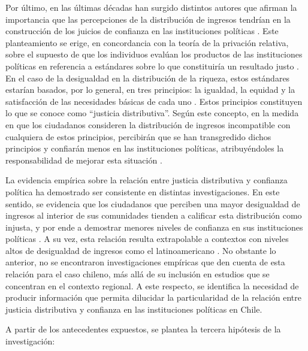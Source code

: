 \documentclass[12pt,twoside]{templates/facsothesis}
\begin{document}
Por último, en las últimas décadas han surgido distintos autores que afirman la importancia que las percepciones de la distribución de ingresos tendrían en la construcción de los juicios de confianza en las instituciones políticas \citep{vandermeerEconomicPerformancePolitical2018}. Este planteamiento se erige, en concordancia con la teoría de la privación relativa, sobre el supuesto de que los individuos evalúan los productos de las instituciones políticas en referencia a estándares sobre lo que constituiría un resultado justo \citep{tylerSocialJustice2015}. En el caso de la desigualdad en la distribución de la riqueza, estos estándares estarían basados, por lo general, en tres principios: la igualdad, la equidad y la satisfacción de las necesidades básicas de cada uno \citep{tylerSocialJustice2015, zmerliIncomeInequalityDistributive2015}. Estos principios constituyen lo que se conoce como ``justicia distributiva''. Según este concepto, en la medida en que los ciudadanos consideren la distribución de ingresos incompatible con cualquiera de estos principios, percibirán que se han transgredido dichos principios y confiarán menos en las instituciones políticas, atribuyéndoles la responsabilidad de mejorar esta situación \citep{tylerInfluencePerceivedInjustice1985, zmerliIncomeInequalityDistributive2015}.

La evidencia empírica sobre la relación entre justicia distributiva y confianza política ha demostrado ser consistente en distintas investigaciones. En este sentido, se evidencia que los ciudadanos que perciben una mayor desigualdad de ingresos al interior de sus comunidades tienden a calificar esta distribución como injusta, y por ende a demostrar menores niveles de confianza en sus instituciones políticas \citep{bobzienIncomeInequalityPolitical2023, gustavssonInequalityTrustSweden2008, leeEconomicPerformanceIncome2020}. A su vez, esta relación resulta extrapolable a contextos con niveles altos de desigualdad de ingresos como el latinoamericano \citep{garcia-sanchezEconomicInequalityUnfairness2025a, wuIncomeInequalityDistributive2019, zmerliIncomeInequalityDistributive2015}. No obstante lo anterior, no se encontraron investigaciones empíricas que den cuenta de esta relación para el caso chileno, más allá de su inclusión en estudios que se concentran en el contexto regional. A este respecto, se identifica la necesidad de producir información que permita dilucidar la particularidad de la relación entre justicia distributiva y confianza en las instituciones políticas en Chile.

A partir de los antecedentes expuestos, se plantea la tercera hipótesis de la investigación:
\end{document}
